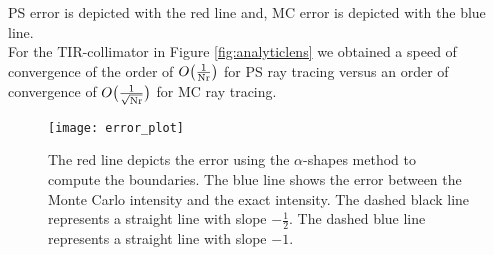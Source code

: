 PS error is depicted with the red line and, MC error is depicted with the blue line. \\ \indent
For the TIR-collimator in Figure \ref{fig:analyticlens} we obtained a speed of convergence of the order of $O\big(\frac{1}{\textrm{Nr}}\big)$ for PS ray tracing versus an order of convergence of $O\big(\frac{1}{\sqrt{\textrm{Nr}}}\big)$ for MC ray tracing.
\begin{figure}[h!]
 \begin{center}
   \texttt{[image: error\_plot]}
    \end{center}
     \caption{The red line depicts the error using the $\alpha$-shapes method to compute the boundaries. 
The blue line shows the error between the Monte Carlo intensity and the exact intensity.
     The dashed black line represents a straight line with slope $-\frac{1}{2}$.
   The dashed blue line represents a straight line with slope $-1$.}
 \label{fig:error2}
\end{figure}
